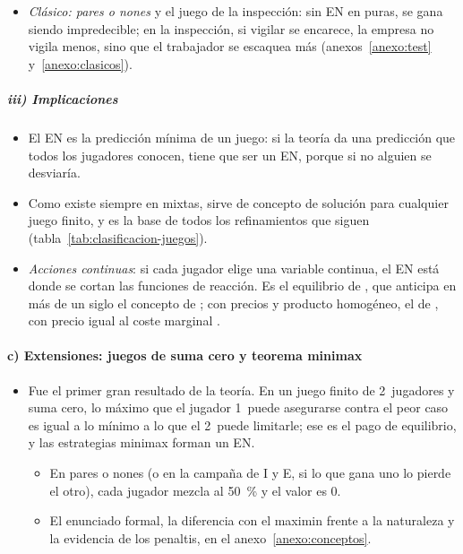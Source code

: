 \documentclass[11pt]{article}
\begin{document}
\begin{itemize}
\begin{itemize}
\begin{itemize}
    \end{itemize}
  \item \emph{Clásico: pares o nones} y el juego de la inspección: sin EN en puras, se gana siendo impredecible; en la inspección, si vigilar se encarece, la empresa no vigila menos, sino que el trabajador se escaquea más (anexos~\ref{anexo:test} y~\ref{anexo:clasicos}).
  \end{itemize}
\end{itemize}

\subparagraph{iii) Implicaciones}

\begin{itemize}
\item El EN es la predicción mínima de un juego: si la teoría da una predicción que todos los jugadores conocen, tiene que ser un EN, porque si no alguien se desviaría.
\item Como existe siempre en mixtas, sirve de concepto de solución para cualquier juego finito, y es la base de todos los refinamientos que siguen (tabla~\ref{tab:clasificacion-juegos}).
\item \emph{Acciones continuas}: si cada jugador elige una variable continua, el EN está donde se cortan las funciones de reacción. Es el equilibrio de \textcite{Cournot1838Recherches}, que anticipa en más de un siglo el concepto de ; con precios y producto homogéneo, el de , con precio igual al coste marginal .
\end{itemize}

\paragraph{c) Extensiones: juegos de suma cero y teorema minimax}

\begin{itemize}
\item Fue el primer gran resultado de la teoría. En un juego finito de 2~jugadores y suma cero, lo máximo que el jugador 1~puede asegurarse contra el peor caso es igual a lo mínimo a lo que el 2~puede limitarle\nocite{VonNeumann1928Theorie}; ese  es el pago de equilibrio, y las estrategias minimax forman un EN.
  \begin{itemize}
  \item En pares o nones (o en la campaña de \textup{I} y E, si lo que gana uno lo pierde el otro), cada jugador mezcla al 50~\% y el valor es 0.
  \item El enunciado formal, la diferencia con el maximin frente a la naturaleza y la evidencia de los penaltis, en el anexo~\ref{anexo:conceptos}.
  \end{itemize}
\end{itemize}
\end{document}

